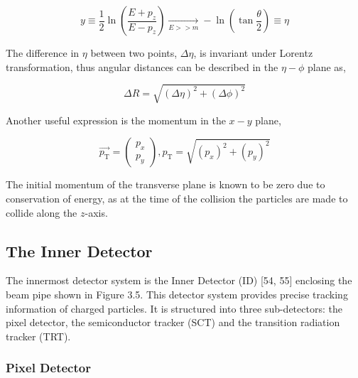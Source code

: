 \begin{equation}
   y \equiv \frac{1}{2}\ln\left(\frac{E+p_z}{E-p_z}\right) \xrightarrow[E>>m]{} -\ln\left(\tan\frac{\theta}{2}\right)\equiv \eta
\end{equation}

The difference in $\eta$ between two points, $\Delta\eta$, is invariant under Lorentz transformation, thus angular distances can be described in the $\eta-\phi$ plane as,

\begin{equation}
    \Delta R = \sqrt{\left(\Delta\eta\right)^2+\left(\Delta\phi\right)^2}
\end{equation}

Another useful expression is the momentum in the $x-y$ plane, 

\begin{equation}
    \vec{p_\text{T}} = \begin{pmatrix} p_x \\ p_y \end{pmatrix}, p_\text{T} = \sqrt{\left(p_x\right)^2+\left(p_y\right)^2}
\end{equation}

The initial momentum of the transverse plane is known to be zero due to conservation of energy, as at the time of the collision the particles are made to collide along the $z$-axis.

\subsection{The Inner Detector}

The innermost detector system is the Inner Detector (ID) [54, 55] enclosing the beam pipe shown in Figure 3.5. This detector system provides precise tracking information of charged particles. It is structured into three sub-detectors: the pixel detector, the semiconductor tracker (SCT) and the transition radiation tracker (TRT).



\subsubsection*{Pixel Detector}

